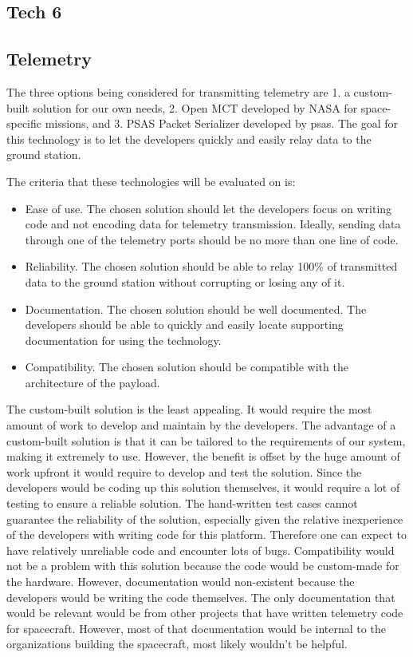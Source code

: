 \documentclass[letterpaper,10pt]{article}
\begin{document}
\subsection{Tech 6}
\subsection{Telemetry}
The three options being considered for transmitting telemetry are
1. a custom-built solution for our own needs, 2. Open MCT developed by NASA for space-specific missions, and 
3. PSAS Packet Serializer developed by \gls{psas}.
The goal for this technology is to let the developers quickly and easily relay data to the ground station.

The criteria that these technologies will be evaluated on is:
\begin{itemize}
\item Ease of use.
The chosen solution should let the developers focus on writing code and not encoding data for telemetry transmission.
Ideally, sending data through one of the telemetry ports should be no more than one line of code. 
\item Reliability.
The chosen solution should be able to relay 100\% of transmitted data to the ground station without corrupting or losing any of it.
\item Documentation.
The chosen solution should be well documented.
The developers should be able to quickly and easily locate supporting documentation for using the technology.
\item Compatibility.
The chosen solution should be compatible with the architecture of the \gls{payload}.
\end{itemize}

The custom-built solution is the least appealing. It would require the most amount of work to develop and maintain by the developers.
The advantage of a custom-built solution is that it can be tailored to the requirements of our system, making it extremely to use.
However, the benefit is offset by the huge amount of work upfront it would require to develop and test the solution.
Since the developers would be coding up this solution themselves, it would require a lot of testing to ensure a reliable solution.
The hand-written test cases cannot guarantee the reliability of the solution, 
especially given the relative inexperience of the developers with writing code for this platform.
Therefore one can expect to have relatively unreliable code and encounter lots of bugs.
Compatibility would not be a problem with this solution because the code would be custom-made for the hardware.
However, documentation would non-existent because the developers would be writing the code themselves.
The only documentation that would be relevant would be from other projects that have written telemetry code for spacecraft.
However, most of that documentation would be internal to the organizations building the spacecraft,
most likely wouldn't be helpful.
\end{document}

